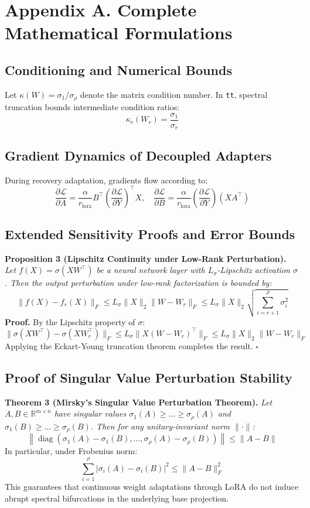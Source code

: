 \section*{Appendix A. Complete Mathematical Formulations}

\subsection*{Conditioning and Numerical Bounds}
Let $\kappa(W) = \sigma_1 / \sigma_\rho$ denote the matrix condition number. In \texttt{tt}, spectral truncation bounds intermediate condition ratios:
\[
\kappa_r(W_r) = \frac{\sigma_1}{\sigma_r}
\]

\subsection*{Gradient Dynamics of Decoupled Adapters}
During recovery adaptation, gradients flow according to:
\[
\frac{\partial \mathcal{L}}{\partial A} = \frac{\alpha}{r_{\text{lora}}} B^\top \left( \frac{\partial \mathcal{L}}{\partial Y} \right)^\top X, \quad \frac{\partial \mathcal{L}}{\partial B} = \frac{\alpha}{r_{\text{lora}}} \left( \frac{\partial \mathcal{L}}{\partial Y} \right) (X A^\top)
\]

\subsection*{Extended Sensitivity Proofs and Error Bounds}
\textbf{Proposition 3 (Lipschitz Continuity under Low-Rank Perturbation).} \textit{Let $f(X) = \sigma(X W^\top)$ be a neural network layer with $L_\sigma$-Lipschitz activation $\sigma$. Then the output perturbation under low-rank factorization is bounded by:}
\[
\|f(X) - f_r(X)\|_F \le L_\sigma \|X\|_2 \|W - W_r\|_F \le L_\sigma \|X\|_2 \sqrt{\sum_{i=r+1}^\rho \sigma_i^2}
\]
\textbf{Proof.} By the Lipschitz property of $\sigma$:
\[
\|\sigma(X W^\top) - \sigma(X W_r^\top)\|_F \le L_\sigma \|X (W - W_r)^\top\|_F \le L_\sigma \|X\|_2 \|W - W_r\|_F
\]
Applying the Eckart-Young truncation theorem completes the result. $\square$

\subsection*{Proof of Singular Value Perturbation Stability}
\textbf{Theorem 3 (Mirsky's Singular Value Perturbation Theorem).} \textit{Let $A, B \in \mathbb{R}^{m \times n}$ have singular values $\sigma_1(A) \ge \dots \ge \sigma_\rho(A)$ and $\sigma_1(B) \ge \dots \ge \sigma_\rho(B)$. Then for any unitary-invariant norm $\|\cdot\|$:}
\[
\left\| \operatorname{diag}(\sigma_1(A) - \sigma_1(B), \dots, \sigma_\rho(A) - \sigma_\rho(B)) \right\| \le \|A - B\|
\]
In particular, under Frobenius norm:
\[
\sum_{i=1}^\rho |\sigma_i(A) - \sigma_i(B)|^2 \le \|A - B\|_F^2
\]
This guarantees that continuous weight adaptations through LoRA do not induce abrupt spectral bifurcations in the underlying base projection.

